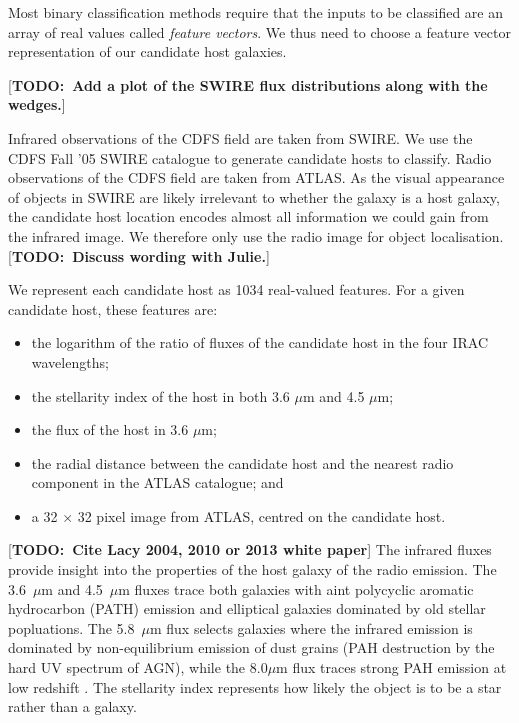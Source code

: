 \documentclass[fleqn,usenatbib,usedcolumn]{mnras}
\newcommand{\todo}[1]{ {\color{red}[{\bf TODO:~{#1}}]} }
\begin{document}
    Most binary classification methods require that the inputs to be classified
    are an array of real values called \emph{feature vectors}. We thus need to
    choose a feature vector representation of our candidate host galaxies.

    \todo{Add a plot of the SWIRE flux distributions along with the wedges.}

    Infrared observations of the CDFS field are taken from SWIRE. We use the
    CDFS Fall '05 SWIRE catalogue \citep{surace05swire} to generate candidate
    hosts to classify. Radio observations of the CDFS field are taken from
    ATLAS. As the visual appearance of objects in SWIRE are likely irrelevant to
    whether the galaxy is a host galaxy, the candidate host location encodes
    almost all information we could gain from the infrared image. We therefore
    only use the radio image for object localisation. \todo{Discuss wording with
    Julie.}

    We represent each candidate host as 1034 real-valued features. For a given
    candidate host, these features are:
    \begin{itemize}
      \item the logarithm of the ratio of fluxes of the candidate host in the
        four IRAC wavelengths;
      \item the stellarity index of the host in both 3.6 $\mu$m and 4.5
        $\mu$m;
      \item the flux of the host in 3.6 $\mu$m;
      \item the radial distance between the candidate host and the nearest
        radio component in the ATLAS catalogue; and
      \item a 32 $\times$ 32 pixel image from ATLAS, centred on the candidate
        host.
    \end{itemize}

    \todo{Cite Lacy 2004, 2010 or 2013 white paper}
    The infrared fluxes provide insight into the properties of the host galaxy
    of the radio emission. The 3.6~$\mu$m and 4.5~$\mu$m fluxes trace both
    galaxies with aint polycyclic aromatic hydrocarbon (PATH) emission and
    elliptical galaxies dominated by old stellar popluations. The 5.8~$\mu$m
    flux selects galaxies where the infrared emission is dominated by
    non-equilibrium emission of dust grains (PAH destruction by the hard UV
    spectrum of AGN), while the 8.0$\mu$m flux traces strong PAH emission at
    low redshift \citep{citeneeded}. The stellarity index represents how
    likely the object is to be a star rather than a galaxy.
\end{document}
